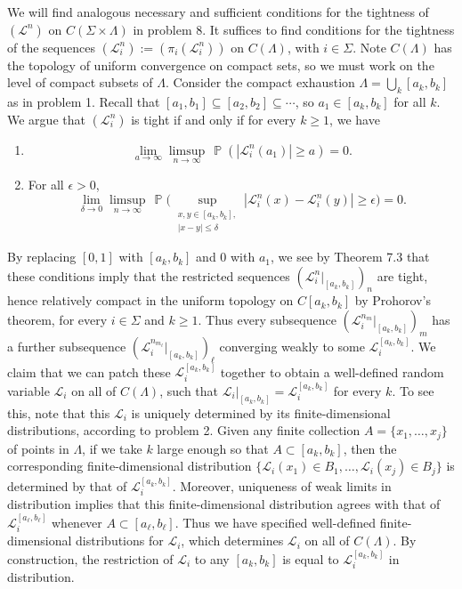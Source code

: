 \documentclass[12pt]{article}
\DeclareMathOperator{\pr}{\mathbb{P}}
\begin{document}
		We will find analogous necessary and sufficient conditions for the tightness of $(\mathcal{L}^n)$ on $C(\Sigma\times\Lambda)$ in problem 8. It suffices to find conditions for the tightness of the sequences $(\mathcal{L}^n_i) := (\pi_i(\mathcal{L}^n_i))$ on $C(\Lambda)$, with $i\in\Sigma$. Note $C(\Lambda)$ has the topology of uniform convergence on compact sets, so we must work on the level of compact subsets of $\Lambda$. Consider the compact exhaustion $\Lambda = \bigcup_k [a_k,b_k]$ as in problem 1. Recall that $[a_1,b_1]\subseteq [a_2,b_2]\subseteq\cdots$, so $a_1\in [a_k,b_k]$ for all $k$. We argue that $(\mathcal{L}^n_i)$ is tight if and only if for every $k\geq 1$, we have
		\begin{enumerate}[label=(\roman*)]
			
			\item 
			\[
			\lim_{a\to\infty} \limsup_{n\to\infty}\, \pr(|\mathcal{L}^n_i(a_1)|\geq a) = 0.
			\]
			
			\item For all $\epsilon>0$,
			\[
			\lim_{\delta\to 0} \limsup_{n\to\infty}\, \pr\bigg(\sup_{\substack{x,y\in [a_k,b_k], \\ |x-y|\leq\delta}} |\mathcal{L}^n_i(x) - \mathcal{L}^n_i(y)| \geq \epsilon\bigg) = 0.
			\]
			
		\end{enumerate}
	
		By replacing $[0,1]$ with $[a_k,b_k]$ and 0 with $a_1$, we see by Theorem 7.3 that these conditions imply that the restricted sequences $(\mathcal{L}^n_i|_{[a_k,b_k]})_n$ are tight, hence relatively compact in the uniform topology on $C[a_k,b_k]$ by Prohorov's theorem, for every $i\in\Sigma$ and $k\geq 1$. Thus every subsequence $(\mathcal{L}^{n_m}_i|_{[a_k,b_k]})_m$ has a further subsequence $(\mathcal{L}^{n_{m_\ell}}_i|_{[a_k,b_k]})_\ell$ converging weakly to some $\mathcal{L}_i^{[a_k,b_k]}$. We claim that we can patch these $\mathcal{L}_i^{[a_k,b_k]}$ together to obtain a well-defined random variable $\mathcal{L}_i$ on all of $C(\Lambda)$, such that $\mathcal{L}_i|_{[a_k,b_k]} = \mathcal{L}_i^{[a_k,b_k]}$ for every $k$. To see this, note that this $\mathcal{L}_i$ is uniquely determined by its finite-dimensional distributions, according to problem 2. Given any finite collection $A=\{x_1,\dots,x_j\}$ of points in $\Lambda$, if we take $k$ large enough so that $A \subset [a_k,b_k]$, then the corresponding finite-dimensional distribution $\{\mathcal{L}_i(x_1)\in B_1, \dots, \mathcal{L}_i(x_j) \in B_j\}$ is determined by that of $\mathcal{L}_i^{[a_k,b_k]}$. Moreover, uniqueness of weak limits in distribution implies that this finite-dimensional distribution agrees with that of $\mathcal{L}_i^{[a_\ell,b_\ell]}$ whenever $A\subset[a_\ell,b_\ell]$. Thus we have specified well-defined finite-dimensional distributions for $\mathcal{L}_i$, which determines $\mathcal{L}_i$ on all of $C(\Lambda)$. By construction, the restriction of $\mathcal{L}_i$ to any $[a_k,b_k]$ is equal to $\mathcal{L}_i^{[a_k,b_k]}$ in distribution.
		
\end{document}
